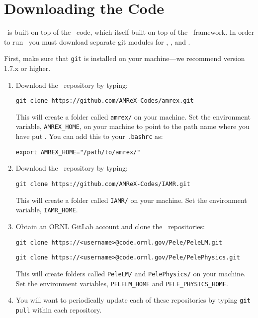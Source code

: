 
\section{Downloading the Code}\label{sec:download}

\pelelm\ is built on top of the \iamr\ code, which itself built on top of the \amrex\ framework.  In order to run
\pelelm\, you must download separate git modules for \pelelm, \iamr, and \amrex.

\vspace{.1in}

\noindent First, make sure that {\tt git} is installed on your machine---we recommend version 1.7.x or higher.

\vspace{.1in}

\begin{enumerate}

\item Download the \amrex\ repository by typing: 
\begin{verbatim}
git clone https://github.com/AMReX-Codes/amrex.git
\end{verbatim}

This will create a folder called {\tt amrex/} on your machine.
Set the environment variable, {\tt AMREX\_HOME}, on your
machine to point to the path name where you have put \amrex.
You can add this to your {\tt .bashrc} as:
\begin{verbatim}
export AMREX_HOME="/path/to/amrex/"
\end{verbatim}

\item Download the \iamr\ repository by typing: 
\begin{verbatim}
git clone https://github.com/AMReX-Codes/IAMR.git
\end{verbatim}

This will create a folder called {\tt IAMR/} on your machine.
Set the environment variable, {\tt IAMR\_HOME}.

\item Obtain an ORNL GitLab account and clone the \pele\ repositories:
\begin{verbatim}
git clone https://<username>@code.ornl.gov/Pele/PeleLM.git
\end{verbatim}
\begin{verbatim}
git clone https://<username>@code.ornl.gov/Pele/PelePhysics.git
\end{verbatim}

This will create folders called {\tt PeleLM/} and {\tt PelePhysics/} on your machine.
Set the environment variables, {\tt PELELM\_HOME} and {\tt PELE\_PHYSICS\_HOME}.

\item You will want to periodically update each of these repositories
by typing {\tt git pull} within each repository.

\end{enumerate}

